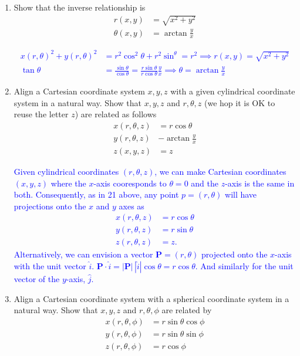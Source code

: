\documentclass[12pt,a4paper]{report}
\newcommand{\BLUE}[1]{\textcolor{blue}{#1}}
\newcommand{\VK}[1]{\textbf{#1}}
\begin{document}
\begin{enumerate}[label=\textbf{\arabic*.}]
\begin{center}
\end{center}


\item Show that the inverse relationship is
\begin{align*}
	r(x,y) &= \sqrt{x^2+y^2} \\
	\theta(x,y) &= \arctan \frac{y}{x}
\end{align*}

\BLUE{\begin{align*}
	x(r,\theta)^2 + y(r, \theta)^2 &= r^2\cos^2\theta+r^2\sin^\theta = r^2 \implies r(x,y) = \sqrt{x^2+y^2}  \\
	\tan \theta &= \frac{\sin\theta}{\cos\theta} = \frac{r\sin\theta}{r\cos\theta} \frac{y}{x} \implies \theta = \arctan\frac{y}{x}
\end{align*}
}

\item Align a Cartesian coordinate system $x,y,z$ with a given cylindrical coordinate system in a natural way.  Show that $x,y,z$ and $r, \theta, z$ (we hop it is OK to reuse the letter $z$) are related as follows
\begin{align*}
	x(r,\theta,z) &= r\cos \theta\\
	y(r,\theta,z) &- \arctan\frac{y}{x} \\
	z(x,y,z) &= z
\end{align*}

\BLUE{Given cylindrical coordinates $(r, \theta, z)$, we can make Cartesian coordinates $(x,y,z)$ where the $x$-axis cooresponds to $\theta = 0$ and the $z$-axis is the same in both.  Consequently, as in 21 above, any point $p=(r, \theta)$  will have projections onto the $x$ and $y$ axes as 
\begin{align*}
	x(r, \theta, z) &= r\cos \theta \\
	y(r, \theta, z) &= r\sin \theta \\
	z(r, \theta, z) &= z.
\end{align*}Alternatively, we can envision a vector $\VK{P} = (r, \theta)$ projected onto the $x$-axis with the unit vector $\hat{i}$.  $\VK{P} \cdot \hat{i} = |\VK{P}|\,|\hat{i}|\cos\theta = r\cos\theta$. And similarly for the unit vector of the $y$-axis, $\hat{j}$.
}

\item Align a Cartesian coordinate system with a spherical coordinate system in a natural way.  Show that $x,y, z$ and $r,\theta,\phi$ are related by
\begin{align*}
	x(r,\theta, \phi) &= r\sin\theta\cos \phi\\
	y(r, \theta, \phi) &= r\sin\theta\sin\phi \\
	z(r, \theta, \phi) &= r\cos \phi
\end{align*}


\end{enumerate}
\end{document}
